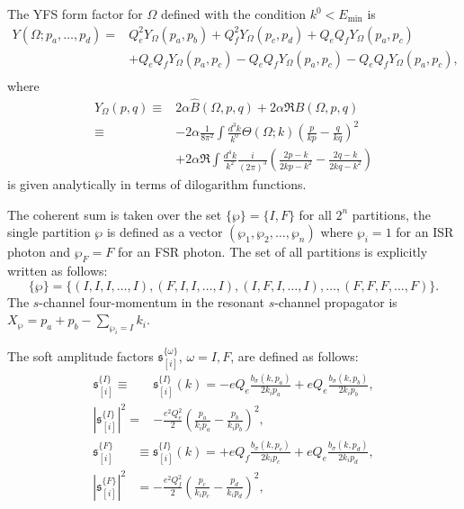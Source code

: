 The YFS form factor \cite{YFS} for $\Omega$ defined with the condition $k^0<E_\text{min}$ is
\begin{align}
Y(\Omega;p_a,\ldots,p_d)=&Q^2_eY_\Omega(p_a,p_b)+Q^2_fY_\Omega(p_c,p_d)+Q_eQ_fY_\Omega(p_a,p_c)\nonumber\\
&+Q_eQ_fY_\Omega(p_a,p_c)-Q_eQ_fY_\Omega(p_a,p_c)-Q_eQ_fY_\Omega(p_a,p_c),\nonumber\\
\end{align}
where
\begin{align}
Y_\Omega(p,q)\equiv&2\alpha\widehat{B}(\Omega,p,q)+2\alpha\Re{B}(\Omega,p,q)\nonumber\\
\equiv&-2\alpha\frac{1}{8\pi^2}\int\frac{d^3k}{k^0}\Theta(\Omega;k)\left(\frac{p}{kp}-\frac{q}{kq}\right)^2\nonumber\\
&+2\alpha\Re\int\frac{d^4k}{k^2}\frac{i}{(2\pi)^3}\left(\frac{2p-k}{2kp-k^2}-\frac{2q-k}{2kq-k^2}\right)
\end{align}
is given analytically in terms of dilogarithm functions. 

The coherent sum is taken over the set $\{\wp\}=\{I,F\}$ for all $2^n$ partitions, the single partition $\wp$ is defined as a vector $(\wp_1,\wp_2,\ldots,\wp_n)$ where $\wp_i=1$ for an ISR photon and $\wp_F=F$ for an FSR photon. The set of all partitions is explicitly written as follows:
\begin{equation*}
\{\wp\}=\{(I,I,I,\ldots,I),(F,I,I,\ldots,I),(I,F,I,\ldots,I),\ldots,(F,F,F,\ldots,F)\}.
\end{equation*}
The $s$-channel four-momentum in the resonant $s$-channel propagator is $X_\wp=p_a+p_b-\sum_{\wp_i=I}k_i$.

The soft amplitude factors $\mathfrak{s}^{\{\omega\}}_{[i]}$, $\omega=I,F$, are defined as follows:
\begin{align}
\mathfrak{s}^{\{I\}}_{[i]}\equiv&\mathfrak{s}^{\{I\}}_{[i]}(k)=-eQ_e\frac{b_\sigma(k,p_a)}{2k_ip_a}+eQ_e\frac{b_\sigma(k,p_b)}{2k_ip_b},\nonumber\\
\left|\mathfrak{s}^{\{I\}}_{[i]}\right|^2=&-\frac{e^2Q_e^2}{2}\left( \frac{p_a}{k_ip_a}-\frac{p_b}{k_ip_b} \right)^2,
\end{align}
\begin{align}
\mathfrak{s}^{\{F\}}_{[i]}&\equiv\mathfrak{s}^{\{I\}}_{[i]}(k)=+eQ_f\frac{b_\sigma(k,p_c)}{2k_ip_c}+eQ_e\frac{b_\sigma(k,p_d)}{2k_ip_d},\nonumber\\
\left|\mathfrak{s}^{\{F\}}_{[i]}\right|^2&=-\frac{e^2Q_f^2}{2}\left( \frac{p_c}{k_ip_c}-\frac{p_d}{k_ip_d} \right)^2,
\end{align}

